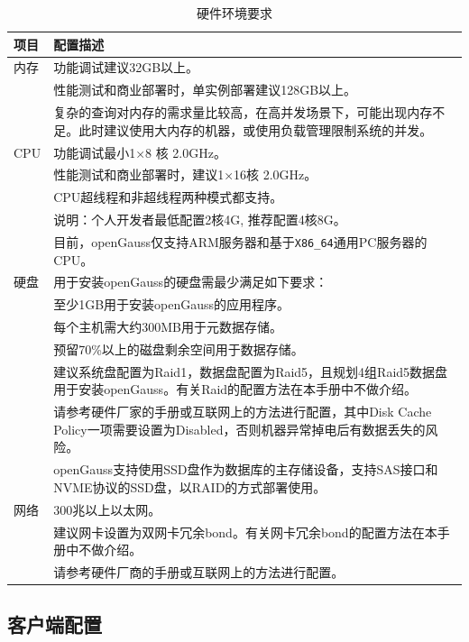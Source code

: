 \documentclass[12pt,UTF8]{ctexbook}
\begin{document}
\begin{table}[htbp]
    \centering
    \caption{硬件环境要求}
    \label{tab:hardware_requirements}
    \begin{tabular}{|l|p{10cm}|}
    \hline
    \textbf{项目} & \textbf{配置描述} \\ \hline
    内存 & 功能调试建议32GB以上。\\ \hline
    & 性能测试和商业部署时，单实例部署建议128GB以上。\\ \hline
    & 复杂的查询对内存的需求量比较高，在高并发场景下，可能出现内存不足。此时建议使用大内存的机器，或使用负载管理限制系统的并发。\\ \hline
    CPU & 功能调试最小1×8 核 2.0GHz。\\ \hline
    & 性能测试和商业部署时，建议1×16核 2.0GHz。\\ \hline
    & CPU超线程和非超线程两种模式都支持。\\ \hline
    & 说明：个人开发者最低配置2核4G, 推荐配置4核8G。\\ \hline
    & 目前，openGauss仅支持ARM服务器和基于\texttt{X86\_64}通用PC服务器的CPU。\\ \hline
    硬盘 & 用于安装openGauss的硬盘需最少满足如下要求：\\ \hline
    & 至少1GB用于安装openGauss的应用程序。\\ \hline
    & 每个主机需大约300MB用于元数据存储。\\ \hline
    & 预留70\%以上的磁盘剩余空间用于数据存储。\\ \hline
    & 建议系统盘配置为Raid1，数据盘配置为Raid5，且规划4组Raid5数据盘用于安装openGauss。有关Raid的配置方法在本手册中不做介绍。\\ \hline
    & 请参考硬件厂家的手册或互联网上的方法进行配置，其中Disk Cache Policy一项需要设置为Disabled，否则机器异常掉电后有数据丢失的风险。\\ \hline
    & openGauss支持使用SSD盘作为数据库的主存储设备，支持SAS接口和NVME协议的SSD盘，以RAID的方式部署使用。\\ \hline
    网络 & 300兆以上以太网。\\ \hline
    & 建议网卡设置为双网卡冗余bond。有关网卡冗余bond的配置方法在本手册中不做介绍。\\ \hline
    & 请参考硬件厂商的手册或互联网上的方法进行配置。\\ \hline
    \end{tabular}
\end{table}

\subsection{客户端配置}
\end{document}
